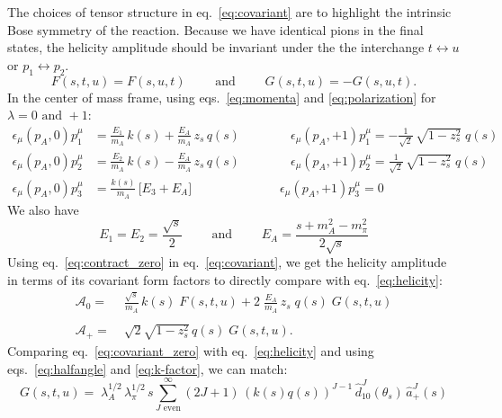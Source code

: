 \documentclass[10pt, aps,prd,amsmath,amssymb,superscriptaddress,onecolumn,
nofootinbib,showpacs,preprintnumbers]{revtex4-1}
\newcommand{\mand}{\qquad \text{ and } \qquad}
\begin{document}
The choices of tensor structure in eq.~\ref{eq:covariant} are to highlight the intrinsic Bose symmetry of the reaction. Because we have identical pions in the final states, the helicity amplitude should be invariant under the the interchange \(t \leftrightarrow u \) or \(p_1 \leftrightarrow p_2\).
  \begin{equation}
    F(s,t,u) = F(s,u,t) \qquad \text{ and } \qquad G(s,t,u) = - G(s,u,t).
  \end{equation}
In the center of mass frame, using eqs.~\ref{eq:momenta} and \ref{eq:polarization} for \(\lambda = 0 \text{ and } +1 \):
  \begin{align}
    \label{eq:contract_zero}
    \epsilon_\mu(p_A,0) p_1^\mu &= \frac{E_1}{m_A} \, k(s) + \frac{E_A}{m_A} \,  z_s \, q(s)
    \qquad \qquad \epsilon_\mu(p_A,+1) p_1^\mu = - \frac{1}{\sqrt{2}} \, \sqrt{1 - z_s^2} \; q(s) \nonumber \\
    \epsilon_\mu(p_A,0) p_2^\mu &= \frac{E_2}{m_A} \, k(s) - \frac{E_A}{m_A} \,  z_s \, q(s)
    \qquad \qquad \epsilon_\mu(p_A,+1) p_2^\mu =  \frac{1}{\sqrt{2}} \, \sqrt{1 - z_s^2} \; q(s)  \\
    \epsilon_\mu(p_A,0) p_3^\mu &= \frac{k(s)}{m_A} \, \big[E_3 + E_A \big]
    \qquad \qquad \qquad \quad \epsilon_\mu(p_A,+1) p_3^\mu = 0 \nonumber
  \end{align}
We also have
  \begin{equation}
    \label{eq:energies}
    E_1 = E_2 = \frac{\sqrt{s}}{2} \mand E_A = \frac{s + m_A^2 - m_\pi^2}{2 \sqrt{s}}
  \end{equation}
Using eq.~\ref{eq:contract_zero} in eq.~\ref{eq:covariant}, we get the helicity amplitude in terms of its covariant form factors to directly compare with eq.~\ref{eq:helicity}:
 \begin{align}
  \label{eq:covariant_zero}
   \mathcal{A}_0 =& \; \frac{\sqrt{s}}{m_A} \, k(s) \; F(s,t,u) + 2 \; \frac{E_A}{m_A} \, z_s \; q(s) \; G(s,t,u) \\
   \nonumber \\
   \label{eq:covariant_plus}
   \mathcal{A}_+ =& \; \sqrt{2} \sqrt{1-z_s^2} \, q(s) \; G(s,t,u).
 \end{align}
Comparing eq.~\ref{eq:covariant_zero} with eq.~\ref{eq:helicity} and using eqs.~\ref{eq:halfangle} and \ref{eq:k-factor}, we can match:
  \begin{equation}
    \label{eq:matching_G}
    G(s,t,u) =  \; \lambda_A^{1/2}  \, \lambda_\pi^{1/2}  \, s \sum_{J \text{ even}}^\infty (2J+1) \, (k(s)q(s))^{J-1} \,\hat{d}^J_{10}(\theta_s) \, \hat{a}^J_+(s)
  \end{equation}
\end{document}
